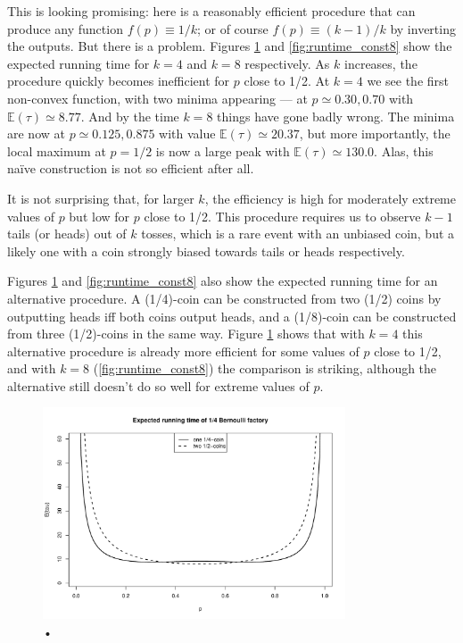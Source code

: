 \documentclass{article}
\theoremstyle{definition}
\newcommand{\E}{\mathbb{E}}
\begin{document}
This is looking promising: here is a reasonably efficient procedure that can produce any function $f(p)\equiv 1/k$; or of course $f(p)\equiv (k-1)/k$ by inverting the outputs.
But there is a problem. Figures \ref{fig:runtime_const4} and \ref{fig:runtime_const8} show the expected running time for $k=4$ and $k=8$ respectively. As $k$ increases, the procedure quickly becomes inefficient for $p$ close to 1/2. At $k=4$ we see the first non-convex function, with two minima appearing --- at $p \simeq 0.30, 0.70$ with $\E(\tau) \simeq 8.77$. And by the time $k=8$ things have gone badly wrong. The minima are now at $p\simeq 0.125, 0.875$ with value $\E(\tau) \simeq 20.37$, but more importantly, the local maximum at $p=1/2$ is now a large peak with $\E(\tau) \simeq 130.0$. Alas, this na\"ive construction is not so efficient after all.

It is not surprising that, for larger $k$, the efficiency is high for moderately extreme values of $p$ but low for $p$ close to 1/2. This procedure requires us to observe $k-1$ tails (or heads) out of $k$ tosses, which is a rare event with an unbiased coin, but a likely one with a coin strongly biased towards tails or heads respectively.

Figures \ref{fig:runtime_const4} and \ref{fig:runtime_const8} also show the expected running time for an alternative procedure. A (1/4)-coin can be constructed from two (1/2) coins by outputting heads iff both coins output heads, and a (1/8)-coin can be constructed from three (1/2)-coins in the same way. Figure \ref{fig:runtime_const4} shows that with $k=4$ this alternative procedure is already more efficient for some values of $p$ close to 1/2, and with $k=8$ (\ref{fig:runtime_const8}) the comparison is striking, although the alternative still doesn't do so well for extreme values of $p$.

\begin{figure}
\centering
\includegraphics[width=0.8\textwidth]{const4_runtime.pdf}
\caption{•}
\label{fig:runtime_const4}
\end{figure}
\end{document}
